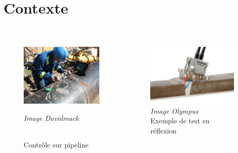 \section{Contexte}

\subsection*{}
\begin{frame}{\insertsectionhead}
\vspace{-0.2cm}
		\begin{columns}
			\centering
			\begin{figure}
				\includegraphics[height=3cm]{./img/us_test.jpg}\\
				{\tiny{\raggedright \itshape Image Davidmack}\\ \centering \scriptsize{Contrôle sur pipeline}}
			\end{figure}		
			\begin{figure}
				\includegraphics[height=3cm]{./img/olympus.jpg}\\
				 {\tiny{\itshape Image Olympus}\\ \centering			\scriptsize{Exemple de test en réflexion}}
			\end{figure}
		\end{columns}	
		\vspace{0.4cm}	


\end{frame}
